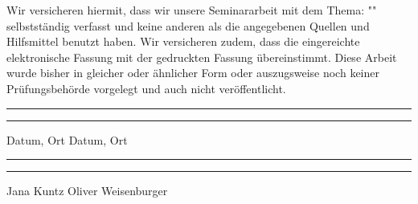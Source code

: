 Wir versicheren hiermit, dass wir unsere Seminararbeit mit dem Thema: "\ThesisTitle " selbstständig verfasst und keine anderen als die angegebenen Quellen und Hilfsmittel benutzt haben. Wir versicheren zudem, dass die eingereichte elektronische Fassung mit der
gedruckten Fassung übereinstimmt.
Diese Arbeit wurde bisher in gleicher oder ähnlicher Form oder auszugsweise
noch keiner Prüfungsbehörde vorgelegt und auch nicht veröffentlicht.

\vspace{50pt} 
\noindent\rule{5cm}{.4pt}\hfill\rule{5cm}{.4pt}\par 
\noindent Datum, Ort  \hspace{7,4cm} Datum, Ort 
\par
\vspace{2cm}
\par
\noindent\rule{5cm}{.4pt}\hfill\rule{5cm}{.4pt}\par 
\noindent Jana Kuntz \hspace{7,4cm} Oliver Weisenburger
